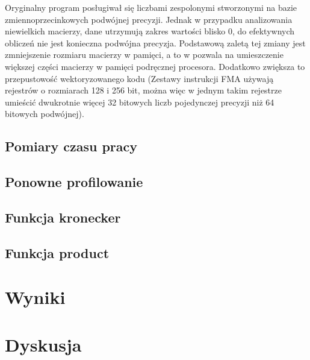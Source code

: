 \documentclass[10pt, a4paper]{article}
\begin{document}
\begin{sloppypar}
    Oryginalny program posługiwał się liczbami zespolonymi stworzonymi na bazie zmiennoprzecinkowych
    podwójnej precyzji. Jednak w przypadku analizowania niewielkich macierzy, dane utrzymują
    zakres wartości blisko 0, do efektywnych obliczeń nie jest konieczna podwójna
    precyzja. Podstawową zaletą tej zmiany jest zmniejszenie rozmiaru macierzy w pamięci,
    a to w pozwala na umieszczenie większej części macierzy w pamięci podręcznej
    procesora. Dodatkowo zwiększa to przepustowość wektoryzowanego kodu (Zestawy
    instrukcji FMA używają rejestrów o rozmiarach 128 i 256 bit, można więc w jednym takim
    rejestrze umieścić dwukrotnie więcej 32 bitowych liczb pojedynczej precyzji niż 64 bitowych
    podwójnej).

    \subsection{Pomiary czasu pracy}


    \subsection{Ponowne profilowanie}


    \subsection{Funkcja kronecker}


    \subsection{Funkcja product}


    \section{Wyniki}


    \section{Dyskusja}
  \end{sloppypar}
  \newpage
  \begin{sloppypar}
    \medskip


    \printbibliography
    [heading=bibintoc, title={Odwołania}]
  \end{sloppypar}
\end{document}
